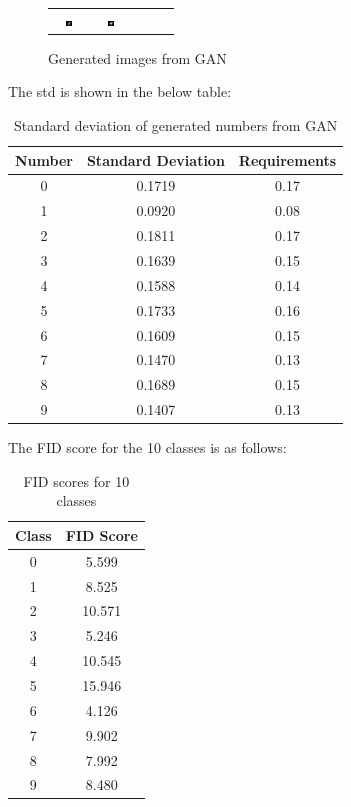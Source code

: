 \documentclass[a4 paper,12pt]{article}
\theoremstyle{definitionstyle}
\begin{document}
\begin{figure}[H]
\begin{tabular}{ccccc}
        \includegraphics[width=0.18\textwidth]{gan/generated/8/8_020.png} &
        \includegraphics[width=0.18\textwidth]{gan/generated/9/9_017.png} &
    \end{tabular}
    \caption{Generated images from GAN}
    \label{gan_generated}
\end{figure}
The std is shown in the below table:
\begin{table}[H]
    \centering
    \begin{tabular}{|c|c|c|}
        \hline
        Number & Standard Deviation & Requirements\\ \hline
        0 & 0.1719 & 0.17 \\\hline
        1 & 0.0920 & 0.08 \\ \hline
        2 & 0.1811 & 0.17 \\ \hline
        3 & 0.1639 & 0.15 \\ \hline
        4 & 0.1588 & 0.14 \\ \hline
        5 & 0.1733 & 0.16 \\ \hline
        6 & 0.1609 & 0.15 \\ \hline
        7 & 0.1470 & 0.13 \\\hline
        8 & 0.1689 & 0.15 \\\hline
        9 & 0.1407 & 0.13 \\\hline
    \end{tabular}
    \caption{Standard deviation of generated numbers from GAN}
    \label{std_table}
\end{table}
The FID score for the 10 classes is as follows:
\begin{table}[H]
    \centering
    \begin{tabular}{|c|c|}
        \hline
        Class & FID Score \\ \hline
        0 & 5.599 \\ \hline
        1 & 8.525 \\ \hline
        2 & 10.571 \\ \hline
        3 & 5.246 \\ \hline
        4 & 10.545 \\ \hline
        5 & 15.946\\ \hline
        6 & 4.126 \\ \hline
        7 & 9.902\\ \hline
        8 & 7.992 \\ \hline
        9 & 8.480
         \\ \hline
    \end{tabular}
    \caption{FID scores for 10 classes}
    \label{fid_table}
\end{table}
\end{document}
